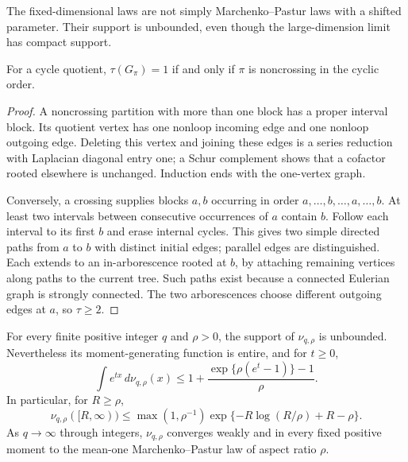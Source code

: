The fixed-dimensional laws are not simply Marchenko--Pastur laws with
a shifted parameter.  Their support is unbounded, even though the
large-dimension limit has compact support.

\begin{lemma}
\label{lem:tree-one-noncrossing}
For a cycle quotient, $\tau(G_\pi)=1$ if and only if $\pi$ is
noncrossing in the cyclic order.
\end{lemma}

\begin{proof}
A noncrossing partition with more than one block has a proper interval
block.  Its quotient vertex has one nonloop incoming edge and one
nonloop outgoing edge.  Deleting this vertex and joining these edges
is a series reduction with Laplacian diagonal entry one; a Schur
complement shows that a cofactor rooted elsewhere is unchanged.
Induction ends with the one-vertex graph.

Conversely, a crossing supplies blocks $a,b$ occurring in order
$a,\ldots,b,\ldots,a,\ldots,b$.  At least two intervals between
consecutive occurrences of $a$ contain $b$.  Follow each interval
to its first $b$ and erase internal cycles.  This gives two simple
directed paths from $a$ to $b$ with distinct initial edges; parallel
edges are distinguished.  Each extends to an in-arborescence rooted
at $b$, by attaching remaining vertices along paths to the current
tree.  Such paths exist because a connected Eulerian graph is
strongly connected.  The two arborescences choose different outgoing
edges at $a$, so $\tau\geq2$.
\end{proof}

\begin{theorem}
\label{thm:coherent-free-limit}
For every finite positive integer $q$ and $\rho>0$, the support of
$\nu_{q,\rho}$ is unbounded.  Nevertheless its moment-generating
function is entire, and for $t\geq0$,
\begin{equation}
 \int e^{tx}\,d\nu_{q,\rho}(x)
 \leq1+\frac{\exp\{\rho(e^t-1)\}-1}{\rho}.
 \label{eq:coherent-entire-bound}
\end{equation}
In particular, for $R\geq\rho$,
\begin{equation}
 \nu_{q,\rho}([R,\infty))
 \leq\max(1,\rho^{-1})
       \exp\{-R\log(R/\rho)+R-\rho\}.
 \label{eq:coherent-poisson-tail}
\end{equation}
As $q\to\infty$ through integers, $\nu_{q,\rho}$ converges weakly
and in every fixed positive moment to the mean-one
Marchenko--Pastur law of aspect ratio $\rho$.
\end{theorem}

